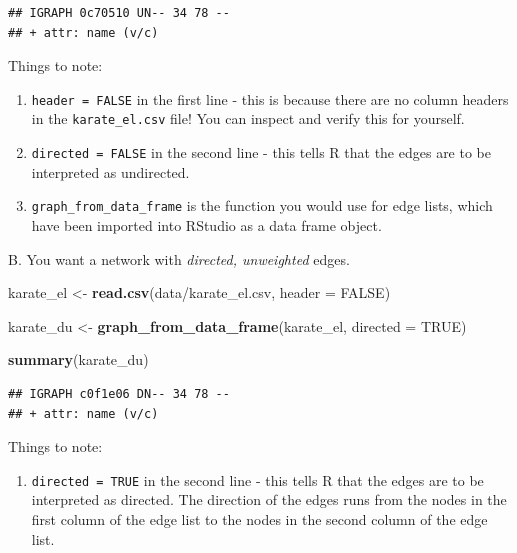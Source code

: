 \documentclass[
]{book}
\newenvironment{Shaded}{\begin{snugshade}}{\end{snugshade}}
\newcommand{\AttributeTok}[1]{\textcolor[rgb]{0.13,0.29,0.53}{#1}}
\newcommand{\ConstantTok}[1]{\textcolor[rgb]{0.56,0.35,0.01}{#1}}
\newcommand{\FunctionTok}[1]{\textcolor[rgb]{0.13,0.29,0.53}{\textbf{#1}}}
\newcommand{\NormalTok}[1]{#1}
\newcommand{\OtherTok}[1]{\textcolor[rgb]{0.56,0.35,0.01}{#1}}
\newcommand{\StringTok}[1]{\textcolor[rgb]{0.31,0.60,0.02}{#1}}
\providecommand{\tightlist}{%
  \setlength{\itemsep}{0pt}\setlength{\parskip}{0pt}}
\begin{document}
\begin{verbatim}
## IGRAPH 0c70510 UN-- 34 78 -- 
## + attr: name (v/c)
\end{verbatim}

Things to note:

\begin{enumerate}
\def\labelenumi{\arabic{enumi}.}
\tightlist
\item
  \texttt{header\ =\ FALSE} in the first line - this is because there are no column headers in the \texttt{karate\_el.csv} file! You can inspect and verify this for yourself.
\item
  \texttt{directed\ =\ FALSE} in the second line - this tells R that the edges are to be interpreted as undirected.
\item
  \texttt{graph\_from\_data\_frame} is the function you would use for edge lists, which have been imported into RStudio as a data frame object.
\end{enumerate}

B. You want a network with \emph{directed, unweighted} edges.

\begin{Shaded}
\begin{Highlighting}[]
\NormalTok{karate\_el }\OtherTok{\textless{}{-}} \FunctionTok{read.csv}\NormalTok{(}\StringTok{\textquotesingle{}data/karate\_el.csv\textquotesingle{}}\NormalTok{, }\AttributeTok{header =} \ConstantTok{FALSE}\NormalTok{)}

\NormalTok{karate\_du }\OtherTok{\textless{}{-}} \FunctionTok{graph\_from\_data\_frame}\NormalTok{(karate\_el, }\AttributeTok{directed =} \ConstantTok{TRUE}\NormalTok{)}

\FunctionTok{summary}\NormalTok{(karate\_du)}
\end{Highlighting}
\end{Shaded}

\begin{verbatim}
## IGRAPH c0f1e06 DN-- 34 78 -- 
## + attr: name (v/c)
\end{verbatim}

Things to note:

\begin{enumerate}
\def\labelenumi{\arabic{enumi}.}
\tightlist
\item
  \texttt{directed\ =\ TRUE} in the second line - this tells R that the edges are to be interpreted as directed. The direction of the edges runs from the nodes in the first column of the edge list to the nodes in the second column of the edge list.
\end{enumerate}
\end{document}
